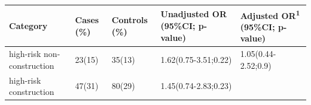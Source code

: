\documentclass[
]{article}
\begin{document}
\begin{longtable}[]{@{}lllll@{}}
\toprule
\begin{minipage}[b]{0.20\columnwidth}\raggedright
Category\strut
\end{minipage} & \begin{minipage}[b]{0.08\columnwidth}\raggedright
Cases (\%)\strut
\end{minipage} & \begin{minipage}[b]{0.10\columnwidth}\raggedright
Controls (\%)\strut
\end{minipage} & \begin{minipage}[b]{0.24\columnwidth}\raggedright
Unadjusted OR (95\%CI; p-value)\strut
\end{minipage} & \begin{minipage}[b]{0.23\columnwidth}\raggedright
Adjusted OR\textsuperscript{1} (95\%CI; p-value)\strut
\end{minipage}\tabularnewline
\midrule
\endhead
\begin{minipage}[t]{0.20\columnwidth}\raggedright
high-risk non-construction\strut
\end{minipage} & \begin{minipage}[t]{0.08\columnwidth}\raggedright
23(15)\strut
\end{minipage} & \begin{minipage}[t]{0.10\columnwidth}\raggedright
35(13)\strut
\end{minipage} & \begin{minipage}[t]{0.24\columnwidth}\raggedright
1.62(0.75-3.51;0.22)\strut
\end{minipage} & \begin{minipage}[t]{0.23\columnwidth}\raggedright
1.05(0.44-2.52;0.9)\strut
\end{minipage}\tabularnewline
\begin{minipage}[t]{0.20\columnwidth}\raggedright
high-risk construction\strut
\end{minipage} & \begin{minipage}[t]{0.08\columnwidth}\raggedright
47(31)\strut
\end{minipage} & \begin{minipage}[t]{0.10\columnwidth}\raggedright
80(29)\strut
\end{minipage} & \begin{minipage}[t]{0.24\columnwidth}\raggedright
1.45(0.74-2.83;0.23)\strut
\end{minipage} & \begin{minipage}[t]{0.23\columnwidth}\raggedright

\end{minipage}
\end{longtable}
\end{document}
